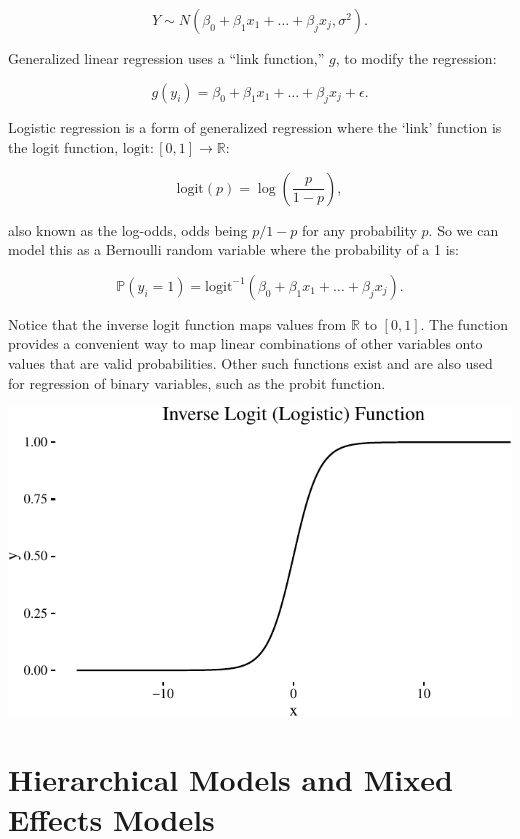 \documentclass[12pt,twoside]{reedthesis}
\begin{document}
  \[Y \sim N(\beta_0 + \beta_1 x_1 + \ldots + \beta_j x_j, \sigma^2).\]
  
  Generalized linear regression uses a ``link function,'' \(g\), to modify
  the regression:
  
  \[g(y_i) = \beta_0 + \beta_1 x_1 + \ldots + \beta_j x_j + \epsilon.\]
  
  Logistic regression is a form of generalized regression where the `link'
  function is the logit function, \(\text{logit}:[0,1] \to \mathbb{R}\):
  
  \[ \text{logit} (p) = \log \left(\frac{p}{1-p}\right), \]
  
  also known as the log-odds, odds being \(p/1-p\) for any probability
  \(p\). So we can model this as a Bernoulli random variable where the
  probability of a 1 is:
  
  \[\mathbb{P} (y_i = 1) = \text{logit}^{-1} (\beta_0 + \beta_1 x_1 + \ldots + \beta_j x_j).\]
  
  Notice that the inverse logit function maps values from \(\mathbb{R}\)
  to \([0,1]\). The function provides a convenient way to map linear
  combinations of other variables onto values that are valid
  probabilities. Other such functions exist and are also used for
  regression of binary variables, such as the probit function.
  
  \begin{center}\includegraphics{thesis_files/figure-latex/unnamed-chunk-1-1} \end{center}
  
  \section{Hierarchical Models and Mixed Effects Models}\label{h-models}
  
\end{document}
